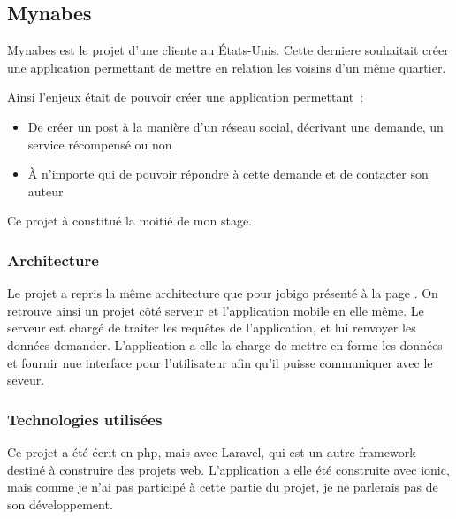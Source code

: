 \documentclass[../rapport.tex]{subfiles}
\begin{document}
        \subsection{Mynabes}\label{subsec:mynabes}
        Mynabes est le projet d'une cliente au États-Unis.
        Cette derniere souhaitait créer une application 
        permettant de mettre en relation les voisins d'un
        même quartier.

        Ainsi l'enjeux était de pouvoir créer une application permettant~:
        \begin{itemize}
            \item De créer un post à la manière d'un réseau social, décrivant une demande, un service récompensé ou non
            \item À n'importe qui de pouvoir répondre à 
                cette demande et de contacter son auteur
        \end{itemize}

        Ce projet à constitué la moitié de mon stage.

        \subsubsection{Architecture}
        Le projet a repris la même architecture que pour jobigo présenté à la page \pageref{subsec:jobigo}. On retrouve ainsi un projet côté serveur et l'application mobile en elle même. Le serveur est chargé de traiter les requêtes de l'application, et lui renvoyer les données demander. L'application a elle la charge de mettre en forme les données et fournir nue interface pour l'utilisateur afin qu'il puisse communiquer avec le seveur.

        \subsubsection{Technologies utilisées}
        Ce projet a été écrit en php, mais avec Laravel, qui est un autre \gls{framework} destiné à construire des projets web.
        L'application a elle été construite avec ionic, mais comme je n'ai pas participé à cette partie du projet, je ne parlerais pas de son développement.
\end{document}
